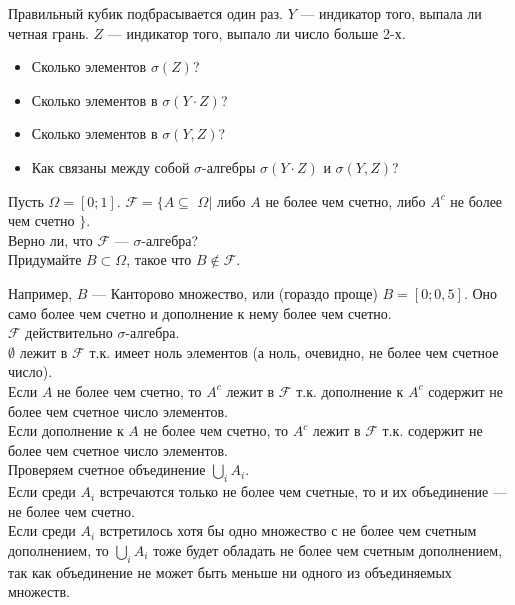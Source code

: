 \begin{problem}
 Правильный кубик подбрасывается один раз. $Y$ — индикатор того, выпала ли четная грань. $Z$ — индикатор того, выпало ли число больше 2-х. \\
\begin{itemize}
\item Сколько элементов $\sigma(Z)$?
\item Сколько элементов в $\sigma(Y\cdot Z)$?
\item Сколько элементов в $\sigma(Y,Z)$?
\item Как связаны между собой $ \sigma $-алгебры $\sigma(Y\cdot Z)$ и $\sigma(Y,Z)$?
\end{itemize}


\begin{sol}

\end{sol}
\end{problem}

\begin{problem}
Пусть $\Omega=[0;1]$. $\mathcal{F}=\{A\subseteq$ $\Omega|$ либо $A$ не
более чем счетно, либо $A^{c}$ не более чем счетно $\}$. \\
Верно ли, что $\mathcal{F}$ — $\sigma$-алгебра? \\
Придумайте $B\subset\Omega$, такое что $B \notin\mathcal{F}$.

\begin{sol}
Например, $B$ — Канторово множество, или (гораздо проще)
$B=[0;0,5]$. Оно само более чем счетно и дополнение к нему более
чем счетно. \\
$\mathcal{F}$ действительно $\sigma$-алгебра. \\
$\emptyset$ лежит в $\mathcal{F}$ т.к. имеет ноль элементов (а ноль,
очевидно, не более чем счетное число). \\
Если $A$ не более чем счетно, то $A^{c}$ лежит в $\mathcal{F}$
т.к. дополнение к $A^{c}$ содержит не более чем счетное
число элементов. \\
Если дополнение к $A$ не более чем счетно, то $A^{c}$ лежит
в $\mathcal{F}$ т.к. содержит не более чем счетное число элементов. \\
Проверяем счетное объединение $\bigcup_{i} A_{i}$. \\
Если среди $A_{i}$ встречаются только не более чем счетные, то и
их объединение — не более чем счетно. \\
Если среди $A_{i}$ встретилось хотя бы одно множество с не более
чем счетным дополнением, то $\bigcup_{i} A_{i}$ тоже будет
обладать не более чем счетным дополнением, так как объединение не
может быть меньше ни одного из объединяемых множеств.
\end{sol}
\end{problem}

